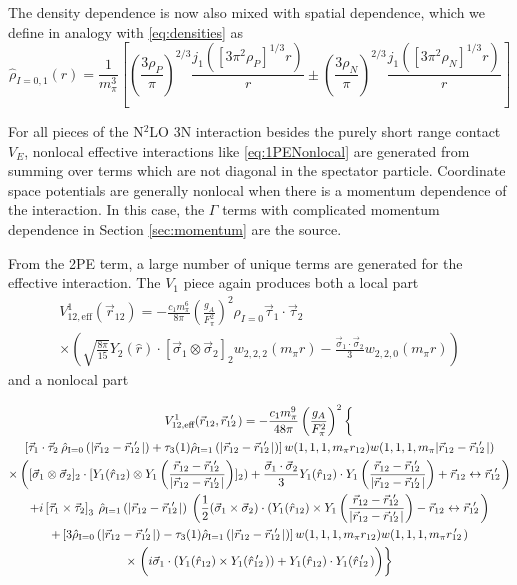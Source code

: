 \documentclass[%
 preprint,
 amsmath,amssymb,
 aps,
]{revtex4-1}
\newcommand{\rhohat}[2]{\hat{\rho}_{\text{I}=#1}\left( #2 \right)}
\newcommand{\rot}{\vec{r}_{12}}
\newcommand{\rotp}{\vec{r}_{12}\!\!\!'\,\,}
\newcommand{\rotpr}{r_{12}\!\!\!\!'\,\,\,}
\newcommand{\rotphat}{\hat{r}_{12}\!\!\!\!'\,\,\,}
\newcommand{\taudot}{\vec{\tau}_1\cdot\vec{\tau}_2}
\newcommand{\taucrossthree}{\left[\vec{\tau}_1\times\vec{\tau}_2\right]_3}
\newcommand{\sigmadot}{\vec{\sigma}_1\cdot\vec{\sigma}_2}
\newcommand{\sigmatwo}{[\vec{\sigma}_1\otimes\vec{\sigma}_2]_2}
\newcommand{\sigmacross}{\vec{\sigma}_1\times\vec{\sigma}_2}
\newcommand{\fracphantom}{\vphantom{\frac{1}{1}}}
\newcommand{\w}[4]{w_{#1,#2,#3}(#4)}
\begin{document}
The density dependence is now also mixed with spatial dependence, which we define in analogy with \eqref{eq:densities} as 
\begin{equation}\label{eq:hatdensities}
\hat{\rho}_{I=0,1}(r)=%
\frac{1}{m_\pi^3}\left[ \left(\frac{3 \rho_P}{\pi}\right)^{2/3} \frac{ j_1( [3\pi^2 \rho_P]^{1/3}  r)}{ r} \pm \left(\frac{3 \rho_N}{\pi}\right)^{2/3} \frac{ j_1( [3\pi^2 \rho_N]^{1/3}  r)}{ r} \right]
\end{equation}

For all pieces of the N$^2$LO 3N interaction besides the purely short range contact $V_E$, nonlocal effective interactions like \eqref{eq:1PENonlocal} are generated from summing over terms which are not diagonal in the spectator particle. Coordinate space potentials are generally nonlocal when there is a momentum dependence of the interaction. In this case, the $\Gamma$ terms with complicated momentum dependence in Section \ref{sec:momentum} are the source.

From the 2PE term, a large number of unique terms are generated for the effective interaction. The $V_1$ piece again produces both a local part 
\begin{multline}
V^{1}_{12,\text{eff}}(\rot)=-\frac{c_1 m_\pi^6}{8\pi}\left(\frac{g_A}{F_\pi^2}\right)^2 \rho_{I=0}\taudot\:\\
 \times\left(\sqrt{\frac{8\pi}{15}}Y_2(\hat{r})\cdot\sigmatwo \w{2}{2}{2}{m_\pi r} -\frac{\sigmadot}{3}  \w{2}{2}{0}{m_\pi r} \right)
\end{multline}
and a nonlocal part 

\begin{multline}
V^{1}_{12,\text{eff}}(\rot,\rotp)=-\frac{c_1 m_\pi^9}{48\pi} \left(\frac{g_A}{F_\pi^2}\right)^2 
\left\{ \vphantom{\frac{1}{3}} \right. \\
\left[ \taudot \: \rhohat{0}{|\rot-\rotp|} + \tau_3(1) \rhohat{1}{|\rot-\rotp|} \right] w(1,1,1, m_\pi r_{12})w(1,1,1, m_\pi | \rot-\rotp | )\\
\times \left( \sigmatwo \cdot [ Y_1 (\hat{r}_{12}) \otimes Y_1 \left(\frac{\rot-\rotp}{|\rot-\rotp|}\right) ]_2
 )  
 +\frac{\sigmadot}{3} Y_1 (\hat{r}_{12}) \cdot Y_1 \left(\frac{\rot-\rotp}{|\rot-\rotp|}\right)
+\rot\leftrightarrow\rotp\right) \\
+ i \taucrossthree\: \rhohat{1}{|\rot-\rotp|} \: \left(\fracphantom
\frac{1}{2}(\sigmacross)\cdot (Y_1 (\hat{r}_{12}) \times Y_1 \left(\frac{\rot-\rotp}{|\rot-\rotp|}\right)-\rot\leftrightarrow\rotp\right) \\
+\left[3\rhohat{0}{|\rot-\rotp|}-\tau_3(1)\rhohat{1}{|\rot-\rotp|}\right]w(1,1,1, m_\pi r_{12})w(1,1,1, m_\pi \rotpr) \\
\times\left.\left(i\vec{\sigma}_1 \cdot (Y_1 (\hat{r}_{12}) \times Y_1(\rotphat)) + Y_1 (\hat{r}_{12}) \cdot Y_1(\rotphat) \fracphantom \right)
\right\}
\end{multline}
\end{document}
